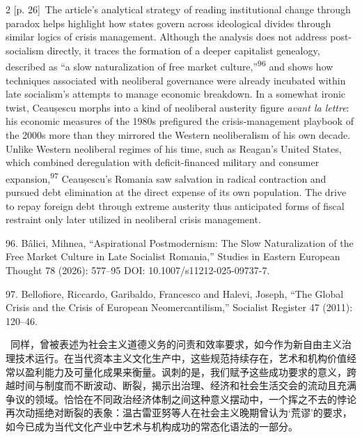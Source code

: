 \documentclass[10pt,a4paper]{article}
\begin{document}
\begin{paracol}{2}
{\scriptsize\color{gray} [p. 26]}\ The article’s analytical strategy of reading institutional change through paradox helps highlight how states govern across ideological divides through similar logics of crisis management. Although the analysis does not address post-socialism directly, it traces the formation of a deeper capitalist genealogy, described as “a slow naturalization of free market culture,”\nobreak\textsuperscript{96} and shows how techniques associated with neoliberal governance were already incubated within late socialism’s attempts to manage economic breakdown. In a somewhat ironic twist, Ceaușescu morphs into a kind of neoliberal austerity figure \textit{avant la lettre}: his economic measures of the 1980s prefigured the crisis-management playbook of the 2000s more than they mirrored the Western neoliberalism of his own decade. Unlike Western neoliberal regimes of his time, such as Reagan’s United States, which combined deregulation with deficit-financed military and consumer expansion,\nobreak\textsuperscript{97} Ceaușescu’s Romania saw salvation in radical contraction and pursued debt elimination at the direct expense of its own population. The drive to repay foreign debt through extreme austerity thus anticipated forms of fiscal restraint only later utilized in neoliberal crisis management.\par{\small 96. Bâlici, Mihnea, “Aspirational Postmodernism: The Slow Naturalization of the Free Market Culture in Late Socialist Romania,” Studies in Eastern European Thought 78 (2026): 577–95 DOI: 10.1007/s11212-025-09737-7.\par}{\small 97. Bellofiore, Riccardo, Garibaldo, Francesco and Halevi, Joseph, “The Global Crisis and the Crisis of European Neomercantilism,” Socialist Register 47 (2011): 120–46.\par}
\switchcolumn*
{\scriptsize\color{gray} [p. 27]}\ 同样，曾被表述为社会主义道德义务的问责和效率要求，如今作为新自由主义治理技术运行。在当代资本主义文化生产中，这些规范持续存在，艺术和机构价值经常以盈利能力及可量化成果来衡量。讽刺的是，我们赋予这些成功要求的意义，跨越时间与制度而不断波动、断裂，揭示出治理、经济和社会生活交会的流动且充满争议的领域。恰恰在不同政治经济体制之间这种意义摆动中，一个挥之不去的悖论再次动摇绝对断裂的表象：温古雷亚努等人在社会主义晚期曾认为‘荒谬’的要求，如今已成为当代文化产业中艺术与机构成功的常态化语法的一部分。\par
\switchcolumn

\end{paracol}
\end{document}
